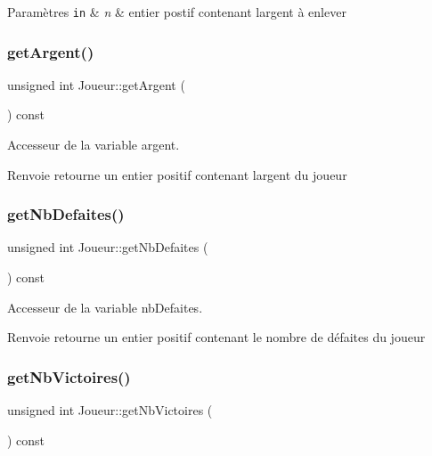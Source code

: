 \begin{DoxyParams}[1]{Paramètres}
\mbox{\tt in}  & {\em n} & entier postif contenant l\textquotesingle{}argent à enlever \\
\hline
\end{DoxyParams}
\mbox{\label{class_joueur_ae06420103fca19bb0dca8ba9ed261bd6}} 
\subsubsection{\texorpdfstring{get\+Argent()}{getArgent()}}
{\footnotesize\ttfamily unsigned int Joueur\+::get\+Argent (\begin{DoxyParamCaption}{ }\end{DoxyParamCaption}) const}



Accesseur de la variable argent. 

\begin{DoxyReturn}{Renvoie}
retourne un entier positif contenant l\textquotesingle{}argent du joueur 
\end{DoxyReturn}
\mbox{\label{class_joueur_a82a78911f157c2fee8a7587064a4ce25}} 
\subsubsection{\texorpdfstring{get\+Nb\+Defaites()}{getNbDefaites()}}
{\footnotesize\ttfamily unsigned int Joueur\+::get\+Nb\+Defaites (\begin{DoxyParamCaption}{ }\end{DoxyParamCaption}) const}



Accesseur de la variable nb\+Defaites. 

\begin{DoxyReturn}{Renvoie}
retourne un entier positif contenant le nombre de défaites du joueur 
\end{DoxyReturn}
\mbox{\label{class_joueur_ae411355727ca5cd183183ba992693180}} 
\subsubsection{\texorpdfstring{get\+Nb\+Victoires()}{getNbVictoires()}}
{\footnotesize\ttfamily unsigned int Joueur\+::get\+Nb\+Victoires (\begin{DoxyParamCaption}{ }\end{DoxyParamCaption}) const}



